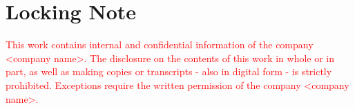 \chapter*{Locking Note}
\textcolor{red}{
This work contains internal and confidential information of the company <company name>.
The disclosure on the contents of this work in whole or in part, as well as making copies or transcripts - also in digital form - is strictly prohibited.
Exceptions require the written permission of the company <company name>.
}